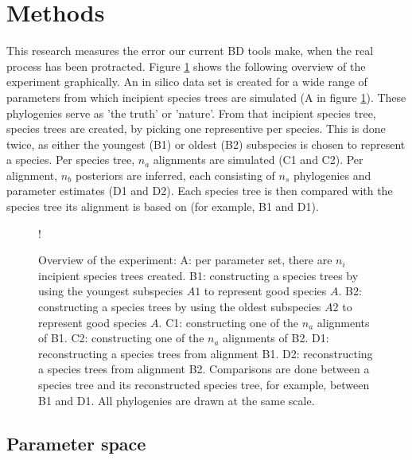 \section{Methods}

This research measures the error our current BD tools make, when
the real process has been protracted. Figure \ref{fig:experiment} shows
the following overview of the experiment graphically.
 An in silico data set is created for a wide
range of parameters from which incipient species trees are simulated (A in figure \ref{fig:experiment}). 
These phylogenies serve as 'the truth' or 'nature'. From that incipient species tree,
species trees are created, by picking one representive per species.
This is done twice, as either the youngest (B1) or oldest (B2) subspecies is chosen
to represent a species. Per species tree, $n_a$ alignments are simulated (C1 and C2).
Per alignment, $n_b$ posteriors are inferred, 
each consisting of $n_s$ phylogenies and parameter estimates (D1 and D2). Each
species tree is then compared with the species tree its alignment is based on (for
example, B1 and D1).

\begin{figure}
  \centering 
  \resizebox {0.8\textwidth} {!} {
    \CreateTikzFigureExperiment{} 
  }
  \caption{
    Overview of the experiment: 
    A: per parameter set, there are $n_i$ incipient species trees created. 
    B1: constructing a species trees by using the youngest subspecies $A1$ to represent good species $A$.
    B2: constructing a species trees by using the oldest subspecies $A2$ to represent good species $A$.
    C1: constructing one of the $n_a$ alignments of B1. 
    C2: constructing one of the $n_a$ alignments of B2. 
    D1: reconstructing a species trees from alignment B1.
    D2: reconstructing a species trees from alignment B2.
    Comparisons are done between a species tree and its reconstructed species tree, 
    for example, between B1 and D1.
    All phylogenies are drawn at the same scale.
  }
  \label{fig:experiment}
\end{figure}

\subsection{Parameter space}
\label{subsec:parameter_space}

